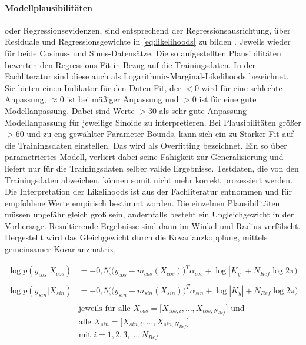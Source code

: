 \paragraph*{Modellplausibilitäten} oder Regressionsevidenzen, sind entsprechend der Regressionsausrichtung, über Residuale und Regressionsgewichte in \autoref{eq:likelihoods} zu bilden \cite{Rasmussen2006}. Jeweils wieder für beide Cosinus- und Sinus-Datensätze. Die so aufgestellten Plausibilitäten bewerten den Regressions-Fit in Bezug auf die Trainingsdaten. In der Fachliteratur \cite{Rasmussen2006} sind diese auch als Logarithmic-Marginal-Likelihoods bezeichnet. Sie bieten einen Indikator für den Daten-Fit, der $< 0$ wird für eine schlechte Anpassung, $\approx 0$ ist bei mäßiger Anpassung und $> 0$ ist für eine gute Modellanpassung. Dabei sind Werte $> 30$ als sehr gute Anpassung Modellanpassung für jeweilige Sinoide zu interpretieren. Bei Plausibilitäten größer $> 60$ und zu eng gewählter Parameter-Bounds, kann sich ein zu Starker Fit auf die Trainingsdaten einstellen. Das wird als Overfitting bezeichnet. Ein so über parametriertes Modell, verliert dabei seine Fähigkeit zur Generalisierung und liefert nur für die Trainingsdaten selber valide Ergebnisse. Testdaten, die von den Trainingsdaten abweichen, können somit nicht mehr korrekt prozessiert werden. Die Interpretation der Likelihoods ist aus der Fachliteratur \cite{Rasmussen2006} entnommen und für empfohlene Werte empirisch bestimmt worden. Die einzelnen Plausibilitäten müssen ungefähr gleich groß sein, andernfalls besteht ein Ungleichgewicht in der Vorhersage. Resultierende Ergebnisse sind dann im Winkel und Radius verfälscht. Hergestellt wird das Gleichgewicht durch die Kovarianzkopplung, mittels gemeinsamer Kovarianzmatrix.


\begin{align}\label{eq:likelihoods}
	\log p(y_{cos}|X_{cos}) &= -0,5 \Big( \big( y_{cos} - m_{cos}(X_{cos}) \big)^T \alpha_{cos} + \log|K_y| + N_{Ref} \log 2\pi  \Big) \nonumber \\
	\\
	\log p(y_{sin}|X_{sin}) &= -0,5 \Big( \big( y_{sin} - m_{sin}(X_{sin}) \big)^T \alpha_{sin} + \log|K_y| + N_{Ref} \log 2\pi  \Big) \nonumber \\
	\nonumber \\
& \text{jeweils für alle } X_{cos} = \big[ X_{cos,i},\dots, X_{cos,N_{Ref}} \big] \text{ und } \nonumber \\
& \text{alle } X_{sin} = \big[ X_{sin,i},\dots, X_{sin,N_{Ref}} \big] \nonumber \\
& \text{mit } i = 1,2,3,\ldots,N_{Ref} \nonumber	
\end{align}


